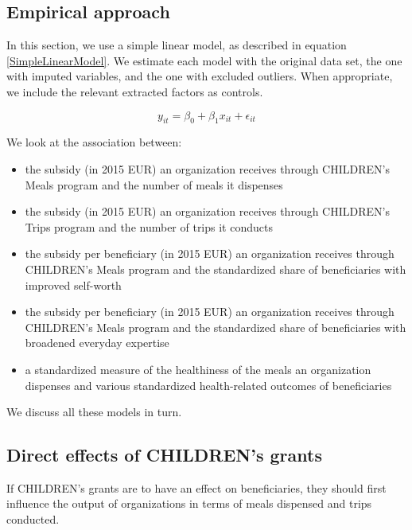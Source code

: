 \documentclass[12pt, a4paper, titlepage]{article}\usepackage[]{graphicx}\usepackage[]{color}
\begin{document}
\subsection{Empirical approach} 

In this section, we use a simple linear model, as described in equation \ref{SimpleLinearModel}. We estimate each model with the original data set, the one with imputed variables, and the one with excluded outliers. When appropriate, we include the relevant extracted factors as controls. 

\begin{equation}
\label{SimpleLinearModel}
  y_{it} = \beta_0 + \beta_1 x_{it} + \epsilon_{it}
\end{equation}

 We look at the association between: 

\begin{itemize}
  \item{the subsidy (in 2015 EUR) an organization receives through CHILDREN's Meals program and the number of meals it dispenses}
  \item{the subsidy (in 2015 EUR) an organization receives through CHILDREN's Trips program and the number of trips it conducts}
  \item{the subsidy per beneficiary (in 2015 EUR) an organization receives through CHILDREN's Meals program and the standardized share of beneficiaries with improved self-worth}
  \item{the subsidy per beneficiary (in 2015 EUR) an organization receives through CHILDREN's Meals program and the standardized share of beneficiaries with broadened everyday expertise}
   \item{a standardized measure of the healthiness of the meals an organization dispenses and various standardized health-related outcomes of beneficiaries} 
\end{itemize}

We discuss all these models in turn.

\subsection{Direct effects of CHILDREN's grants} 

If CHILDREN's grants are to have an effect on beneficiaries, they should first influence the output of organizations in terms of meals dispensed and trips conducted. 
\end{document}
